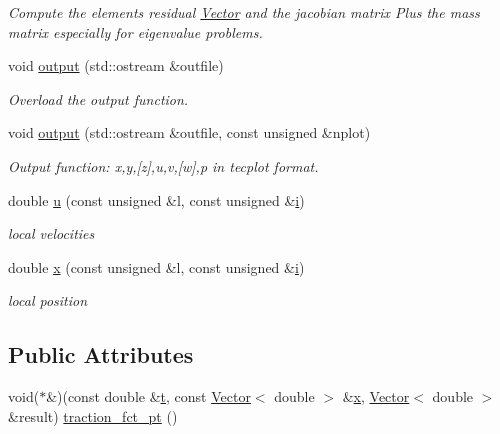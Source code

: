 \begin{DoxyCompactItemize}
\begin{DoxyCompactList}\small\item\em Compute the element\textquotesingle{}s residual \hyperlink{classoomph_1_1Vector}{Vector} and the jacobian matrix Plus the mass matrix especially for eigenvalue problems. \end{DoxyCompactList}\item 
void \hyperlink{classoomph_1_1PolarNavierStokesTractionElement_a0376005bcf22e0af08e071dba309a1d9}{output} (std\+::ostream \&outfile)
\begin{DoxyCompactList}\small\item\em Overload the output function. \end{DoxyCompactList}\item 
void \hyperlink{classoomph_1_1PolarNavierStokesTractionElement_af52b911eda2c01d9d124ad29d9be1004}{output} (std\+::ostream \&outfile, const unsigned \&nplot)
\begin{DoxyCompactList}\small\item\em Output function\+: x,y,\mbox{[}z\mbox{]},u,v,\mbox{[}w\mbox{]},p in tecplot format. \end{DoxyCompactList}\item 
double \hyperlink{classoomph_1_1PolarNavierStokesTractionElement_aa998536fa55d84030a856e6c08efb41f}{u} (const unsigned \&l, const unsigned \&\hyperlink{cfortran_8h_adb50e893b86b3e55e751a42eab3cba82}{i})
\begin{DoxyCompactList}\small\item\em local velocities \end{DoxyCompactList}\item 
double \hyperlink{classoomph_1_1PolarNavierStokesTractionElement_a9c89a9bed61686e2fb60717f133f8f02}{x} (const unsigned \&l, const unsigned \&\hyperlink{cfortran_8h_adb50e893b86b3e55e751a42eab3cba82}{i})
\begin{DoxyCompactList}\small\item\em local position \end{DoxyCompactList}\end{DoxyCompactItemize}
\subsection*{Public Attributes}
\begin{DoxyCompactItemize}
\item 
void($\ast$\&)(const double \&\hyperlink{cfortran_8h_af6f0bd3dc13317f895c91323c25c2b8f}{t}, const \hyperlink{classoomph_1_1Vector}{Vector}$<$ double $>$ \&\hyperlink{classoomph_1_1PolarNavierStokesTractionElement_a9c89a9bed61686e2fb60717f133f8f02}{x}, \hyperlink{classoomph_1_1Vector}{Vector}$<$ double $>$ \&result) \hyperlink{classoomph_1_1PolarNavierStokesTractionElement_a4d05f1d3a021af63ff7c99b78cd24e58}{traction\+\_\+fct\+\_\+pt} ()
\end{DoxyCompactItemize}
